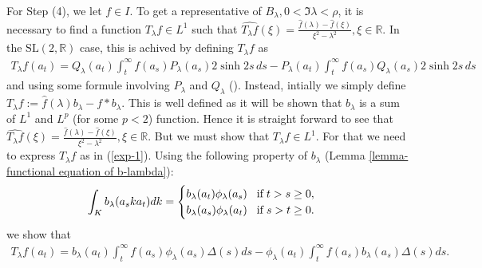 \documentclass[11pt,reqno]{amsart}
\newcommand{\what}{\widehat}%
\newcommand{\R}{\mathbb R}%
\theoremstyle{definition}
\theoremstyle{definition}
\numberwithin{equation}{section}
\begin{document}
For Step (4), we let $f\in I$. To get a representative of $B_\lambda, 0<\Im\lambda<\rho$, it is necessary to find a function $T_\lambda f\in L^1$ such that $\what{T_\lambda f}(\xi)=\frac{\what{f}(\lambda)-\what{f}(\xi)}{\xi^2-\lambda^2}, \xi\in\R$. In the $\mathrm{SL}(2, \R)$ case, this is achived by defining $T_\lambda f$ as 
\begin{eqnarray}\label{exp-1} 
T_\lambda f(a_t )=Q_{\lambda}(a_t)\int_t^\infty f(a_s) P_\lambda(a_s)2\sinh 2s \,ds - P_\lambda(a_t)\int_t^\infty f(a_s)Q_{\lambda}(a_s)2\sinh 2s \,ds
\end{eqnarray} 
and using some formule involving $P_\lambda$ and $Q_\lambda$ (\cite[(2-9) (2-10)]{Ben-2}). Instead, intially we simply define  $T_\lambda f:=\widehat{f}(\lambda)b_\lambda -f*b_\lambda.$ This is well defined as it will be shown that $b_\lambda$ is a sum of $L^1$ and $L^p$ (for some $p<2$) function. Hence it is straight forward to see that $\what{T_\lambda f}(\xi)=\frac{\what{f}(\lambda)-\what{f}(\xi)}{\xi^2-\lambda^2}, \xi\in\R$. But we must show that $T_\lambda f\in L^1$. For that we  need to express $T_\lambda f$ as in (\ref{exp-1}). Using the following property of $b_\lambda$ (Lemma \ref{lemma-functional equation of b-lambda}): \begin{eqnarray*}\int_K b_\lambda(a_ska_t)dk=
\begin{cases}
b_\lambda(a_t)\phi_\lambda 
(a_s)\hspace{3mm}\textup{if}
\hspace{1mm}t> s\geq 0,\\
b_\lambda(a_s)\phi_\lambda(a_t)\hspace{3mm}\textup{if}
\hspace{1mm}s > t\geq 0.
\end{cases}
\end{eqnarray*}
we show that
\begin{eqnarray}\label{exp-2}
T_\lambda f(a_t)=b_\lambda(a_t)\int_t^\infty f(a_s)\phi_\lambda(a_s)\Delta(s)ds-\phi_\lambda(a_t)
\int_t^\infty f(a_s)b_\lambda(a_s)\Delta(s)ds.
\end{eqnarray}
\end{document}
